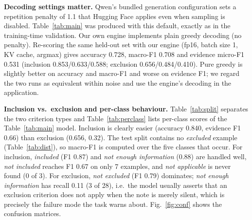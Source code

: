 \begin{table}[t]
\caption{Held-out test results (206 criteria, 8 patients), before/after tuning and baselines. Generation: Hugging Face \texttt{generate}, fp16, batch 16, greedy with the model's default repetition penalty of 1.1 (see text).}
\label{tab:main}
\centering\scriptsize

\end{table}

\textbf{Decoding settings matter.} Qwen's bundled generation configuration sets a repetition penalty of 1.1 that Hugging Face applies even when sampling is disabled. Table~\ref{tab:main} was produced with this default, exactly as in the training-time validation. Our own engine implements plain greedy decoding (no penalty). Re-scoring the same held-out set with our engine (fp16, batch size 1, KV cache, argmax) gives accuracy 0.728, macro-F1 0.708 and evidence micro-F1 0.531 (inclusion 0.853/0.633/0.588; exclusion 0.656/0.484/0.410). Pure greedy is slightly better on accuracy and macro-F1 and worse on evidence F1; we regard the two runs as equivalent within noise and use the engine's decoding in the application.

\textbf{Inclusion vs.\ exclusion and per-class behaviour.} Table~\ref{tab:split} separates the two criterion types and Table~\ref{tab:perclass} lists per-class scores of the Table~\ref{tab:main} model. Inclusion is clearly easier (accuracy 0.840, evidence F1 0.66) than exclusion (0.656, 0.32). The test split contains no \emph{excluded} example (Table~\ref{tab:dist}), so macro-F1 is computed over the five classes that occur. For inclusion, \emph{included} (F1 0.87) and \emph{not enough information} (0.88) are handled well, \emph{not included} reaches F1 0.67 on only 7 examples, and \emph{not applicable} is never found (0 of 3). For exclusion, \emph{not excluded} (F1 0.79) dominates; \emph{not enough information} has recall 0.11 (3 of 28), i.e.\ the model usually asserts that an exclusion criterion does not apply when the note is merely silent, which is precisely the failure mode the task warns about. Fig.~\ref{fig:conf} shows the confusion matrices.

\begin{table}[t]
\caption{Test results separated by criterion type, with evidence precision/recall/F1 (micro).}
\label{tab:split}
\centering\scriptsize

\end{table}

\begin{table}[t]
\caption{Per-class precision, recall and F1 on the test set for the model of Table~\ref{tab:main}.}
\label{tab:perclass}
\centering\scriptsize

\end{table}

